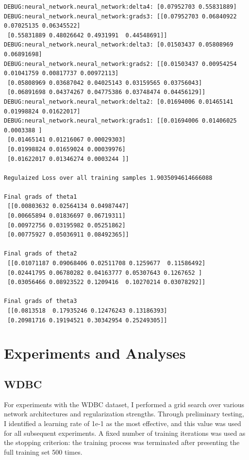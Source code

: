 \documentclass[letterpaper]{article}
\begin{document}
\begin{verbatim}
DEBUG:neural_network.neural_network:delta4: [0.07952703 0.55831889]
DEBUG:neural_network.neural_network:grads3: [[0.07952703 0.06840922 0.07025135 0.06345522]
 [0.55831889 0.48026642 0.4931991  0.44548691]]
DEBUG:neural_network.neural_network:delta3: [0.01503437 0.05808969 0.06891698]
DEBUG:neural_network.neural_network:grads2: [[0.01503437 0.00954254 0.01041759 0.00817737 0.00972113]
 [0.05808969 0.03687042 0.04025143 0.03159565 0.03756043]
 [0.06891698 0.04374267 0.04775386 0.03748474 0.04456129]]
DEBUG:neural_network.neural_network:delta2: [0.01694006 0.01465141 0.01998824 0.01622017]
DEBUG:neural_network.neural_network:grads1: [[0.01694006 0.01406025 0.0003388 ]
 [0.01465141 0.01216067 0.00029303]
 [0.01998824 0.01659024 0.00039976]
 [0.01622017 0.01346274 0.0003244 ]]

Regulaized Loss over all training samples 1.9035094614666088

Final grads of theta1
 [[0.00803632 0.02564134 0.04987447]
 [0.00665894 0.01836697 0.06719311]
 [0.00972756 0.03195982 0.05251862]
 [0.00775927 0.05036911 0.08492365]]

Final grads of theta2
 [[0.01071187 0.09068406 0.02511708 0.1259677  0.11586492]
 [0.02441795 0.06780282 0.04163777 0.05307643 0.1267652 ]
 [0.03056466 0.08923522 0.1209416  0.10270214 0.03078292]]

Final grads of theta3
 [[0.0813518  0.17935246 0.12476243 0.13186393]
 [0.20981716 0.19194521 0.30342954 0.25249305]]
\end{verbatim}
\clearpage

\section{Experiments and Analyses}
\subsection{WDBC}

For experiments with the WDBC dataset, I performed a grid search over various network architectures and regularization strengths. Through preliminary testing, I identified a learning rate of 1e-1 as the most effective, and this value was used for all subsequent experiments. A fixed number of training iterations was used as the stopping criterion: the training process was terminated after presenting the full training set 500 times.
\end{document}
